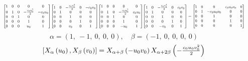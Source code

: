 \documentclass[11pt]{article}
\theoremstyle{definition}
\begin{document}
\[
\scaletoalign{\textwidth}{{\left[\begin{matrix}1 & 0 & 0 & 0 & 0\\0 & 1 & 0 & - \frac{c_{0} u_{0}^{2}}{2} & - c_{0} u_{0}\\0 & 0 & 1 & 0 & 0\\0 & 0 & 0 & 1 & 0\\0 & 0 & 0 & u_{0} & 1\end{matrix}\right]} {\left[\begin{matrix}1 & 0 & - \frac{c_{0} v_{0}^{2}}{2} & 0 & - c_{0} v_{0}\\0 & 1 & 0 & 0 & 0\\0 & 0 & 1 & 0 & 0\\0 & 0 & 0 & 1 & 0\\0 & 0 & v_{0} & 0 & 1\end{matrix}\right]} {\left[\begin{matrix}1 & 0 & 0 & 0 & 0\\0 & 1 & 0 & - \frac{c_{0} u_{0}^{2}}{2} & c_{0} u_{0}\\0 & 0 & 1 & 0 & 0\\0 & 0 & 0 & 1 & 0\\0 & 0 & 0 & - u_{0} & 1\end{matrix}\right]} {\left[\begin{matrix}1 & 0 & - \frac{c_{0} v_{0}^{2}}{2} & 0 & c_{0} v_{0}\\0 & 1 & 0 & 0 & 0\\0 & 0 & 1 & 0 & 0\\0 & 0 & 0 & 1 & 0\\0 & 0 & - v_{0} & 0 & 1\end{matrix}\right]} = {\left[\begin{matrix}1 & 0 & 0 & c_{0} u_{0} v_{0} & 0\\0 & 1 & - c_{0} u_{0} v_{0} & 0 & 0\\0 & 0 & 1 & 0 & 0\\0 & 0 & 0 & 1 & 0\\0 & 0 & 0 & 0 & 1\end{matrix}\right]}}
\]
\[
\alpha = \left( 1, \  -1, \  0, \  0, \  0\right), \quad \beta = \left( -1, \  0, \  0, \  0, \  0\right)
\]
\[
\scaletoalign{\textwidth}{\left[ X_{\alpha}\left(u_{0}\right), X_{\beta}\left(v_{0}\right) \right] = X_{\alpha + \beta}\left(- u_{0} v_{0}\right) X_{\alpha + 2\beta}\left(- \frac{c_{0} u_{0} v_{0}^{2}}{2}\right)}
\]
\end{document}
